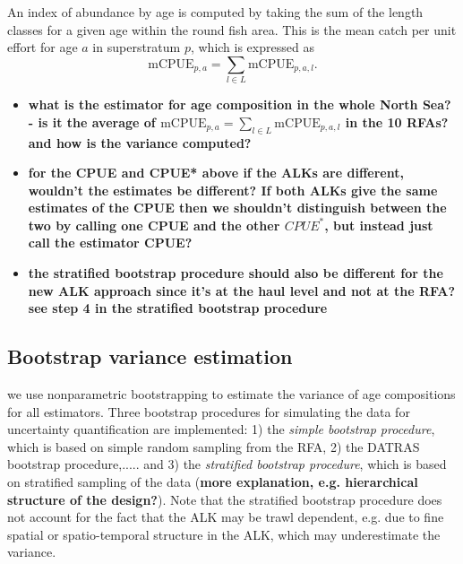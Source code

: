 \documentclass[a4paper 12pt]{article}
\numberwithin{equation}{section}
\begin{document}
\noindent An index of abundance by age is computed by taking the sum of the length classes for a given age within the round fish area. This is the mean catch per unit effort for age $a$ in superstratum $p$, which is expressed as
\begin{equation}
\mathrm{mCPUE}_{p,a} =  \sum\limits_{l \in L} \mathrm{mCPUE}_{p,a,l}.
\label{ageIndex}
\end{equation}

\begin{itemize}
\item {\bf what is the estimator for age composition in the whole North Sea? - is it the average of $\mathrm{mCPUE}_{p,a} =  \sum\limits_{l \in L} \mathrm{mCPUE}_{p,a,l}$ in the 10 RFAs? and how is the variance computed?}

\item {\bf for the CPUE and CPUE* above if the ALKs are different, wouldn't the estimates be different? If both ALKs give the same estimates of the CPUE then we shouldn't distinguish between the two by calling one CPUE and the other $CPUE^*$, but instead just call the estimator CPUE?}

\item {\bf the stratified bootstrap procedure should also be different for the new ALK approach since it's at the haul level and not at the RFA? see step 4 in the stratified bootstrap procedure}

\end{itemize}

\subsection{Bootstrap variance estimation}
\label{bootall}
we use nonparametric bootstrapping \citep{carpenter2000bootstrap} to estimate the variance of age compositions for all estimators. Three bootstrap procedures for simulating the data for uncertainty quantification are implemented: 1) the \textit{simple bootstrap procedure}, which is based on simple random sampling from the RFA, 2) the DATRAS bootstrap procedure,..... and 3) the \textit{stratified bootstrap procedure}, which is based on stratified sampling of the data ({\bf more explanation, e.g. hierarchical structure of the design?}). Note that the stratified bootstrap procedure does not account for the fact that the ALK may be trawl dependent, e.g. due to fine spatial or spatio-temporal structure in the ALK, which may underestimate the variance.
\end{document}
